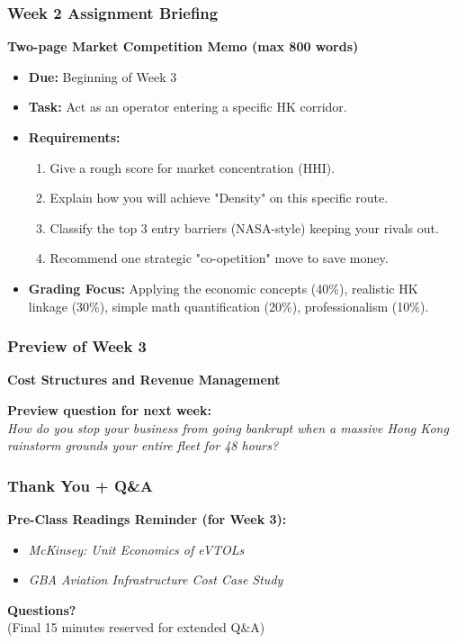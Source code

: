 \documentclass{beamer}
\begin{document}
\begin{frame}[t]
  \frametitle{Week 2 Assignment Briefing}
  
  \textbf{Two-page Market Competition Memo (max 800 words)}
  \begin{itemize}
    \item \textbf{Due:} Beginning of Week 3
    \item \textbf{Task:} Act as an operator entering a specific HK corridor.
    \item \textbf{Requirements:} 
    \begin{enumerate}
        \item Give a rough score for market concentration (HHI).
        \item Explain how you will achieve "Density" on this specific route.
        \item Classify the top 3 entry barriers (NASA-style) keeping your rivals out.
        \item Recommend one strategic "co-opetition" move to save money.
    \end{enumerate}
    \item \textbf{Grading Focus:} Applying the economic concepts (40\%), realistic HK linkage (30\%), simple math quantification (20\%), professionalism (10\%).
  \end{itemize}
\end{frame}

\begin{frame}[t]
  \frametitle{Preview of Week 3}
  
  \begin{center}
      \Large \textbf{Cost Structures and Revenue Management}
  \end{center}
  
  \vspace{1cm}
  \textbf{Preview question for next week:} \\
  \textit{How do you stop your business from going bankrupt when a massive Hong Kong rainstorm grounds your entire fleet for 48 hours?}
\end{frame}

\begin{frame}[t]
  \frametitle{Thank You + Q\&A}
  
  \textbf{Pre-Class Readings Reminder (for Week 3):}
  \begin{itemize}
      \item \textit{McKinsey: Unit Economics of eVTOLs}
      \item \textit{GBA Aviation Infrastructure Cost Case Study}
  \end{itemize}
  
  \vspace{1cm}
  \begin{center}
      \textbf{Questions?} \\
      \small (Final 15 minutes reserved for extended Q\&A)
  \end{center}
\end{frame}
\end{document}
